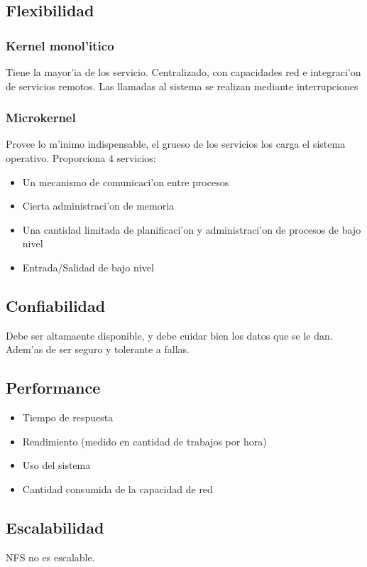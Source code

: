 \documentclass[a4paper,spanish]{article}
\begin{document}
\subsection{Flexibilidad}
\subsubsection{Kernel monol'itico}
Tiene la mayor'ia de los servicio. Centralizado, con capacidades red e integraci'on de servicios remotos. Las llamadas al sistema se realizan mediante interrupciones
\subsubsection{Microkernel}
Provee lo m'inimo indispensable, el grueso de los servicios los carga el sistema operativo. Proporciona 4 servicios:
\begin{itemize}
	\item Un mecanismo de comunicaci'on entre procesos
	\item Cierta administraci'on de memoria
	\item Una cantidad limitada de planificaci'on y administraci'on de procesos de bajo nivel
	\item Entrada/Salidad de bajo nivel
\end{itemize}

\subsection{Confiabilidad}
Debe ser altamaente disponible, y debe cuidar bien los datos que se le dan.
Adem'as de ser seguro y tolerante a fallas.

\subsection{Performance}
\begin{itemize}
	\item Tiempo de respuesta
	\item Rendimiento (medido en cantidad de trabajos por hora)
	\item Uso del sistema
	\item Cantidad consumida de la capacidad de red
\end{itemize}

\subsection{Escalabilidad}
NFS no es escalable.
\end{document}
